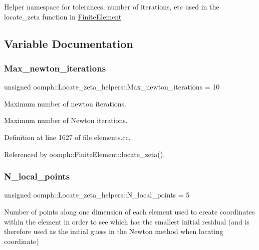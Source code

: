 Helper namespace for tolerances, number of iterations, etc used in the locate\+\_\+zeta function in \hyperlink{classoomph_1_1FiniteElement}{Finite\+Element} 

\subsection{Variable Documentation}
\mbox{\label{namespaceoomph_1_1Locate__zeta__helpers_a473b3aa4666ed6dfeb49bff0c6ed0e71}} 
\subsubsection{\texorpdfstring{Max\+\_\+newton\+\_\+iterations}{Max\_newton\_iterations}}
{\footnotesize\ttfamily unsigned oomph\+::\+Locate\+\_\+zeta\+\_\+helpers\+::\+Max\+\_\+newton\+\_\+iterations = 10}



Maximum number of newton iterations. 

Maximum number of Newton iterations. 

Definition at line 1627 of file elements.\+cc.



Referenced by oomph\+::\+Finite\+Element\+::locate\+\_\+zeta().

\mbox{\label{namespaceoomph_1_1Locate__zeta__helpers_ad92daa85eb93813c72e1ec57cce15382}} 
\subsubsection{\texorpdfstring{N\+\_\+local\+\_\+points}{N\_local\_points}}
{\footnotesize\ttfamily unsigned oomph\+::\+Locate\+\_\+zeta\+\_\+helpers\+::\+N\+\_\+local\+\_\+points = 5}

Number of points along one dimension of each element used to create coordinates within the element in order to see which has the smallest initial residual (and is therefore used as the initial guess in the Newton method when locating coordinate)

